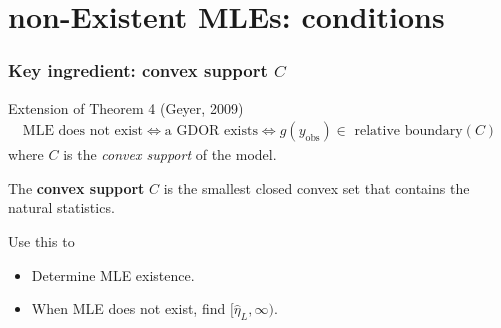 \documentclass[ 10pt]{beamer}
\newcommand{\etaLCM}{\hat{\eta}_{\textrm{LCM}}}
\newcommand{\yobs}{y_{\text{obs}}}
\begin{document}
\section{non-Existent MLEs: conditions}
\frame
{
  \frametitle{Key ingredient: convex support $C$}  
\begin{block}{Extension of Theorem 4 (Geyer, 2009)}
\begin{align*}
\text{MLE does not exist} \iff \text{a GDOR exists} \iff \text{$g(\yobs) \in$ relative boundary$(C)$}
\end{align*}
where  $C$ is the \emph{convex support} of the model.
\end{block}
\vspace{2mm}

The \textbf{convex support} $C$ is the smallest closed convex set that contains the natural statistics.
\vspace{2mm}

Use this to
\begin{itemize}
\item Determine MLE existence.
\item When MLE does not exist, find $[\hat{\eta}_L, \infty)$.
\end{itemize}

}
\end{document}
